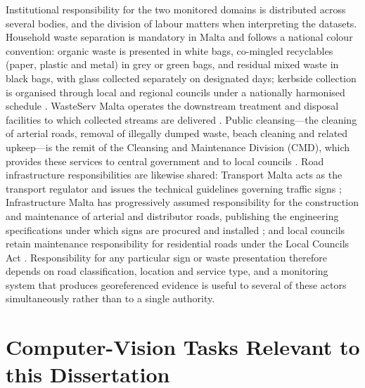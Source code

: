 Institutional responsibility for the two monitored domains is distributed across several bodies, and the division of labour matters when interpreting the datasets. Household waste separation is mandatory in Malta and follows a national colour convention: organic waste is presented in white bags, co-mingled recyclables (paper, plastic and metal) in grey or green bags, and residual mixed waste in black bags, with glass collected separately on designated days; kerbside collection is organised through local and regional councils under a nationally harmonised schedule \citep{wastecollection2026web,era2023web}. WasteServ Malta operates the downstream treatment and disposal facilities to which collected streams are delivered \citep{wasteserv2026web}. Public cleansing---the cleaning of arterial roads, removal of illegally dumped waste, beach cleaning and related upkeep---is the remit of the Cleansing and Maintenance Division (CMD), which provides these services to central government and to local councils \citep{cmd2026web}. Road infrastructure responsibilities are likewise shared: Transport Malta acts as the transport regulator and issues the technical guidelines governing traffic signs \citep{transportmalta2021guidelines}; Infrastructure Malta has progressively assumed responsibility for the construction and maintenance of arterial and distributor roads, publishing the engineering specifications under which signs are procured and installed \citep{infrastructuremalta2020spec}; and local councils retain maintenance responsibility for residential roads under the Local Councils Act \citep{localcouncilsact1993}. Responsibility for any particular sign or waste presentation therefore depends on road classification, location and service type, and a monitoring system that produces georeferenced evidence is useful to several of these actors simultaneously rather than to a single authority.

\section{Computer-Vision Tasks Relevant to this Dissertation}
\label{sec:bg-tasks}

